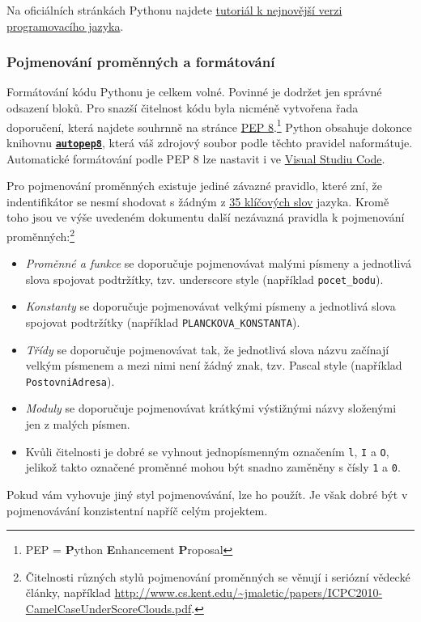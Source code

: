 \documentclass[a4paper,11pt,twoside]{article}
\def\code#1{\textnormal{\texttt{#1}}}
\def\file#1{\textnormal{\textbf{\texttt{#1}}}}
\def\abbreviation#1{\textnormal{\textsc{#1}}}
\theoremstyle{red}
\theoremstyle{green}
\begin{document}
    Na oficiálních stránkách Pythonu najdete \href{https://docs.python.org/3/tutorial/}{tutoriál k nejnovější verzi programovacího jazyka}.

\subsubsection{Pojmenování proměnných a formátování}
    Formátování kódu Pythonu je celkem volné.
    Povinné je dodržet jen správné odsazení bloků.
    Pro snazší čitelnost kódu byla nicméně vytvořena řada doporučení, která najdete souhrnně na stránce \href{https://www.python.org/dev/peps/pep-0008}{PEP 8}.\footnote{\abbreviation{PEP} = {\bf P}ython {\bf E}nhancement {\bf P}roposal}
    Python obsahuje dokonce knihovnu \file{\href{https://pypi.org/project/autopep8/}{autopep8}}, která váš zdrojový soubor podle těchto pravidel naformátuje.
    Automatické formátování podle PEP 8 lze nastavit i ve \href{https://code.visualstudio.com/docs/python/editing#_formatting}{Visual Studiu Code}.
        
    Pro pojmenování proměnných existuje jediné závazné pravidlo, které zní, že indentifikátor se nesmí shodovat s žádným z \href{https://docs.python.org/3/reference/lexical_analysis.html#keywords}{35 klíčových slov} jazyka.
    Kromě toho jsou ve výše uvedeném dokumentu další nezávazná pravidla k pojmenování proměnných:\footnote{
        Čitelnosti různých stylů pojmenování proměnných se věnují i seriózní vědecké články, například
        \url{http://www.cs.kent.edu/~jmaletic/papers/ICPC2010-CamelCaseUnderScoreClouds.pdf}.
    }
    \begin{itemize}
        \item
            \emph{Proměnné a funkce} se doporučuje pojmenovávat malými písmeny a jednotlivá slova spojovat podtržítky, tzv. underscore style (například \code{pocet_bodu}).
        \item
            \emph{Konstanty} se doporučuje pojmenovávat velkými písmeny a jednotlivá slova spojovat podtržítky (například \code{PLANCKOVA_KONSTANTA}).
        \item
            \emph{Třídy} se doporučuje pojmenovávat tak, že jednotlivá slova názvu začínají velkým písmenem a mezi nimi není žádný znak, tzv. Pascal style (například \code{PostovniAdresa}).
        \item
            \emph{Moduly} se doporučuje pojmenovávat krátkými výstižnými názvy složenými jen z malých písmen.
        \item
            Kvůli čitelnosti je dobré se vyhnout jednopísmenným označením \code{l}, \code{I} a \code{O}, jelikož takto označené proměnné mohou být snadno zaměněny s čísly \code{1} a \code{0}.

    \end{itemize}
    Pokud vám vyhovuje jiný styl pojmenovávání, lze ho použít.
    Je však dobré být v pojmenovávání konzistentní napříč celým projektem.
\end{document}
